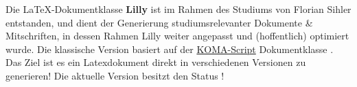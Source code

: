 Die \LaTeX-Dokumentklasse \textbf{Lilly} ist im Rahmen des Studiums von Florian Sihler entstanden, und dient der Generierung studiumsrelevanter Dokumente \& Mitschriften, in dessen Rahmen Lilly weiter angepasst und (hoffentlich) optimiert wurde. Die klassische Version basiert auf der \href{https://komascript.de}{KOMA-Script} Dokumentklasse .\newline
Das Ziel ist es ein Latexdokument direkt in verschiedenen Versionen zu generieren! Die aktuelle Version \say{\LILLYxVERSIONxLONG} besitzt den Status \LILLYxSTATUS!